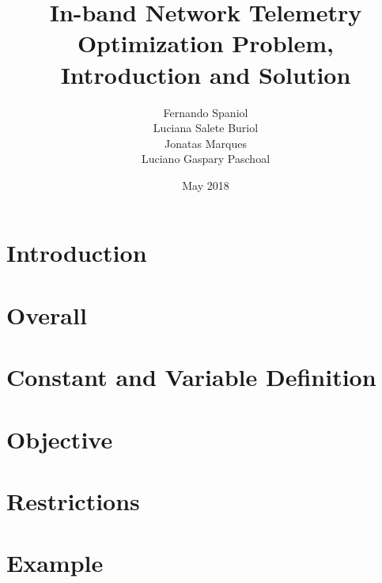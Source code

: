 \documentclass{article}
\title{In-band Network Telemetry Optimization Problem, Introduction and Solution}
\author{ Fernando Spaniol \\ Luciana Salete Buriol \\ Jonatas Marques \\ Luciano Gaspary Paschoal}
\date{May 2018}
\begin{document}
\maketitle

\section{Introduction}



\section{Overall}



\section{Constant and Variable Definition}



\section{Objective}



\section{Restrictions}



\section{Example}


\end{document}
